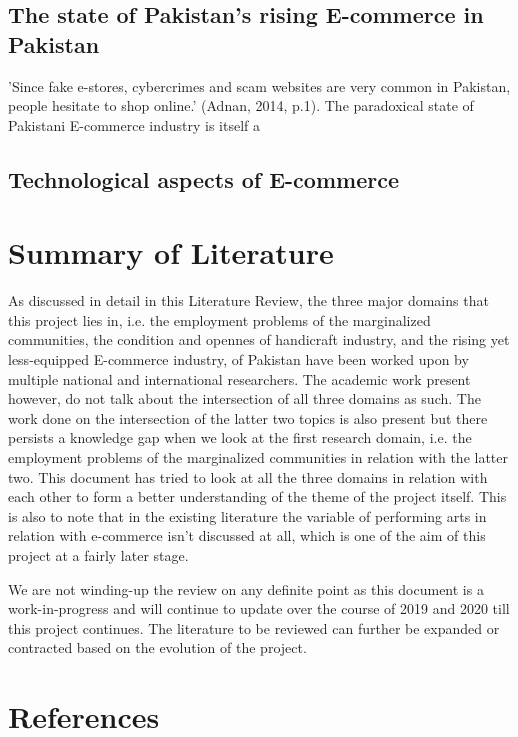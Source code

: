 \subsection{The state of Pakistan's rising E-commerce in Pakistan}

'Since fake e-stores, cybercrimes and scam websites are very common in Pakistan, people hesitate to shop online.' (Adnan,  2014, p.1). The paradoxical state of Pakistani E-commerce industry is itself a 

\subsection*{Technological aspects of E-commerce}

\section{Summary of Literature}

As discussed in detail in this Literature Review, the three major domains that this project lies in, i.e. the employment problems of the marginalized communities, the condition and opennes of handicraft industry, and the rising yet less-equipped E-commerce industry, of Pakistan have been worked upon by multiple national and international researchers. The academic work present however, do not talk about the intersection of all three domains as such. The work done on the intersection of the latter two topics is also present but there persists a knowledge gap when we look at the first research domain, i.e. the employment problems of the marginalized communities in relation with the latter two. This document has tried to look at all the three domains in relation with each other to form a better understanding of the theme of the project itself. This is also to note that in the existing literature the variable of performing arts in relation with e-commerce isn't discussed at all, which is one of the aim of this project at a fairly later stage. 

We are not winding-up the review on any definite point as this document is a work-in-progress and will continue to update over the course of 2019 and 2020 till this project continues. The literature to be reviewed can further be expanded or contracted based on the evolution of the project. 
\section{References}

